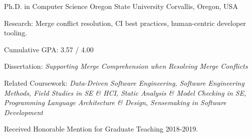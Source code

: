 

\begin{cventries}

  \cventry
    {Ph.D. in Computer Science} %
    {Oregon State University} %
    {Corvallis, Oregon, USA} %
    {} %
    {
      \begin{briefSection}
        \begin{cvitems} %
      	  \item {Research: Merge conflict resolution, CI best practices, human-centric developer tooling.}
        \end{cvitems}
      \end{briefSection}
      \begin{detailSection}
        \begin{cvitems} %
      	  \item {Cumulative GPA: 3.57 / 4.00}
      	  \item {Dissertation: \textit {Supporting Merge Comprehension when Resolving Merge Conflicts}}
          \item {Related Coursework: \textit {Data-Driven Software Engineering, Software Engineering Methods, Field Studies in SE \& HCI, Static Analysis \& Model Checking in SE, Programming Language Architecture \& Design, Sensemaking in Software Development}}
          \item {Received Honorable Mention for Graduate Teaching 2018-2019.}
        \end{cvitems}
      \end{detailSection}
    }
    

\end{cventries}
